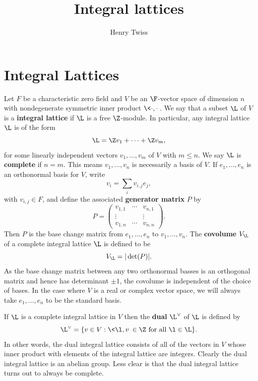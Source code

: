 \documentclass[12pt]{article}
\title{Integral lattices}
\author{Henry Twiss}
\begin{document}
  \date{}
  \maketitle
  \section{Integral Lattices}
    Let \(F\) be a characteristic zero field and \(V\) be an \(\F\)-vector space of dimension \(n\) with nondegenerate symmetric inner product \(\<\cdot,\cdot\>\). We say that a subset \(\L\) of \(V\) is a \textbf{integral lattice} if \(\L\) is a free \(\Z\)-module. In particular, any integral lattice \(\L\) is of the form
    \[
      \L = \Z v_{1}+\cdots+\Z v_{m},
    \]
    for some linearly independent vectors \(v_{1},\ldots,v_{m}\) of \(V\) with \(m \le n\). We say \(\L\) is \textbf{complete} if \(n = m\). This means \(v_{1},\ldots,v_{n}\) is necessarily a basis of \(V\). If \(e_{1},\ldots,e_{n}\) is an orthonormal basis for \(V\), write
    \[
      v_{i} = \sum_{i}v_{i,j}e_{j},
    \]
    with \(v_{i,j} \in F\), and define the associated \textbf{generator matrix} \(P\) by
    \[
      P = \begin{pmatrix} v_{1,1} & \cdots & v_{n,1} \\ \vdots & & \vdots \\ v_{1,n} & \cdots & v_{n,n} \end{pmatrix}.
    \]
    Then \(P\) is the base change matrix from \(e_{1},\ldots,e_{n}\) to \(v_{1},\ldots,v_{n}\). The \textbf{covolume} \(V_{\L}\) of a complete integral lattice \(\L\) is defined to be
    \[
      V_{\L} = |\det(P)|.
    \]
    As the base change matrix between any two orthonormal basses is an orthogonal matrix and hence has determinant \(\pm 1\), the covolume is independent of the choice of bases. In the case where \(V\) is a real or complex vector space, we will always take \(e_{1},\ldots,e_{n}\) to be the standard basis.
    
    If \(\L\) is a complete integral lattice in \(V\) then the \textbf{dual} \(\L^{\vee}\) of \(\L\) is defined by
    \[
      \L^{\vee} = \{v \in V:\<\l,v\> \in \Z \text{ for all } \l \in \L\}.
    \]
    In other words, the dual integral lattice consists of all of the vectors in \(V\) whose inner product with elements of the integral lattice are integers. Clearly the dual integral lattice is an abelian group. Less clear is that the dual integral lattice turns out to always be complete.
\end{document}

